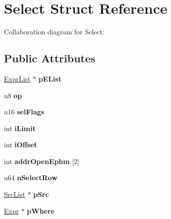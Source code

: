 \hypertarget{struct_select}{\section{Select Struct Reference}
\label{struct_select}
}


Collaboration diagram for Select\+:
\subsection*{Public Attributes}
\begin{DoxyCompactItemize}
\item 
\hypertarget{struct_select_acf92c5d6b0e0e6a3263a77696baaadc8}{\hyperlink{struct_expr_list}{Expr\+List} $\ast$ {\bfseries p\+E\+List}}\label{struct_select_acf92c5d6b0e0e6a3263a77696baaadc8}

\item 
\hypertarget{struct_select_a84506d61248313b5e10f7891cb7482be}{u8 {\bfseries op}}\label{struct_select_a84506d61248313b5e10f7891cb7482be}

\item 
\hypertarget{struct_select_a1c445561ea66d48573c8d8751108c743}{u16 {\bfseries sel\+Flags}}\label{struct_select_a1c445561ea66d48573c8d8751108c743}

\item 
\hypertarget{struct_select_abf68908bf029af42a32c60a2558a8b1e}{int {\bfseries i\+Limit}}\label{struct_select_abf68908bf029af42a32c60a2558a8b1e}

\item 
\hypertarget{struct_select_ac12bebd00ed988df3ad1efb8e6c63fe4}{int {\bfseries i\+Offset}}\label{struct_select_ac12bebd00ed988df3ad1efb8e6c63fe4}

\item 
\hypertarget{struct_select_a7b55849c381b5452e42313aa7aa183ec}{int {\bfseries addr\+Open\+Ephm} \mbox{[}2\mbox{]}}\label{struct_select_a7b55849c381b5452e42313aa7aa183ec}

\item 
\hypertarget{struct_select_a361db95401908ac5f717dc2027b35542}{u64 {\bfseries n\+Select\+Row}}\label{struct_select_a361db95401908ac5f717dc2027b35542}

\item 
\hypertarget{struct_select_a4e3b9b176a8e1b4af988405ff1f090db}{\hyperlink{struct_src_list}{Src\+List} $\ast$ {\bfseries p\+Src}}\label{struct_select_a4e3b9b176a8e1b4af988405ff1f090db}

\item 
\hypertarget{struct_select_a0562c1e19acde263a04af015611d8ce8}{\hyperlink{struct_expr}{Expr} $\ast$ {\bfseries p\+Where}}\label{struct_select_a0562c1e19acde263a04af015611d8ce8}


\end{DoxyCompactItemize}
